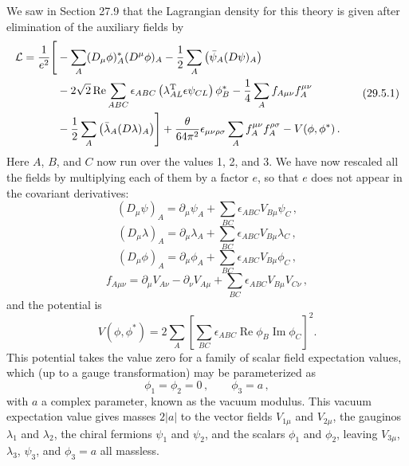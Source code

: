 We saw in Section 27.9 that the Lagrangian density for this theory is given
after elimination of the auxiliary fields by
\begin{equation}
  \begin{aligned}
  \mathcal{L}
  =\frac{1}{e^2}\Biggl[
  &-\sum_A(D_\mu\phi)_A^*(D^\mu\phi)_A
  -\frac12\sum_A\left(\bar\psi_A(\sl{D}\psi)_A\right)
  \\
  &-2\sqrt{2}\operatorname{Re}\sum_{ABC}
    \epsilon_{ABC}
    \left(\lambda_{AL}^{\mathrm T}\epsilon\psi_{CL}\right)\phi_B^*
  -\frac14\sum_A f_{A\mu\nu}f_A^{\mu\nu}
  \\
  &-\frac12\sum_A\left(\bar\lambda_A(\sl{D}\lambda)_A\right)
  \Biggr]
  +\frac{\theta}{64\pi^2}\epsilon_{\mu\nu\rho\sigma}
    \sum_A f_A^{\mu\nu}f_A^{\rho\sigma}
  -V(\phi,\phi^*)\,.
  \end{aligned}
  \tag{29.5.1}\label{eq:29.5.1}
\end{equation}
Here \(A\), \(B\), and \(C\) now run over the values 1, 2, and 3. We have now
rescaled all the fields by multiplying each of them by a factor \(e\), so
that \(e\) does not appear in the covariant derivatives:
\begin{equation}
  (D_\mu\psi)_A
  =\partial_\mu\psi_A+\sum_{BC}\epsilon_{ABC}V_{B\mu}\psi_C\,,
  \tag{29.5.2}\label{eq:29.5.2}
\end{equation}
\begin{equation}
  (D_\mu\lambda)_A
  =\partial_\mu\lambda_A+\sum_{BC}\epsilon_{ABC}V_{B\mu}\lambda_C\,,
  \tag{29.5.3}\label{eq:29.5.3}
\end{equation}
\begin{equation}
  (D_\mu\phi)_A
  =\partial_\mu\phi_A+\sum_{BC}\epsilon_{ABC}V_{B\mu}\phi_C\,,
  \tag{29.5.4}\label{eq:29.5.4}
\end{equation}
\begin{equation}
  f_{A\mu\nu}
  =\partial_\mu V_{A\nu}-\partial_\nu V_{A\mu}
  +\sum_{BC}\epsilon_{ABC}V_{B\mu}V_{C\nu}\,,
  \tag{29.5.5}\label{eq:29.5.5}
\end{equation}
and the potential is
\begin{equation}
  V(\phi,\phi^*)
  =2\sum_A\left[
    \sum_{BC}\epsilon_{ABC}\operatorname{Re}\phi_B
    \operatorname{Im}\phi_C
  \right]^2.
  \tag{29.5.6}\label{eq:29.5.6}
\end{equation}
This potential takes the value zero for a family of scalar field expectation
values, which (up to a gauge transformation) may be parameterized as
\begin{equation}
  \phi_1=\phi_2=0\,,
  \qquad
  \phi_3=a\,,
  \tag{29.5.7}\label{eq:29.5.7}
\end{equation}
with \(a\) a complex parameter, known as the vacuum modulus. This vacuum
expectation value gives masses \(2\lvert a\rvert\) to the vector fields
\(V_{1\mu}\) and \(V_{2\mu}\), the gauginos \(\lambda_1\) and \(\lambda_2\),
the chiral fermions \(\psi_1\) and \(\psi_2\), and the scalars \(\phi_1\) and
\(\phi_2\), leaving \(V_{3\mu}\), \(\lambda_3\), \(\psi_3\), and
\(\phi_3=a\) all massless.

